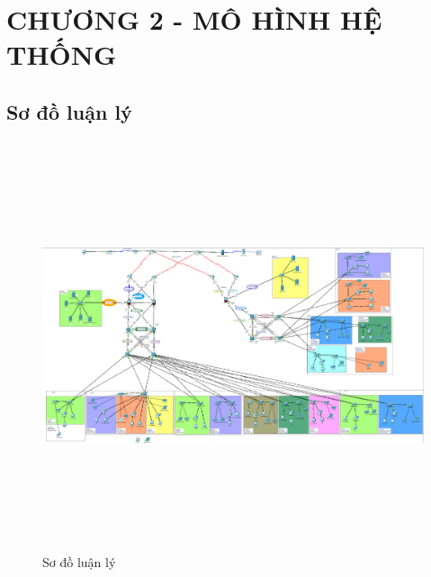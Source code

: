 \documentclass[a4paper, 12pt]{article}
\begin{document}
\section*{CHƯƠNG 2 - MÔ HÌNH HỆ THỐNG}
\setcounter{section}{2}
\setcounter{subsection}{0}
\setcounter{figure}{0}
\setcounter{table}{0}
\subsection{Sơ đồ luận lý}
\begin{figure}[H]
    \centering
    \includegraphics[width=16cm, height=12cm]{img/logic.png}
    \caption{Sơ đồ luận lý}
    \label{hinh21}
\end{figure}
\end{document}

